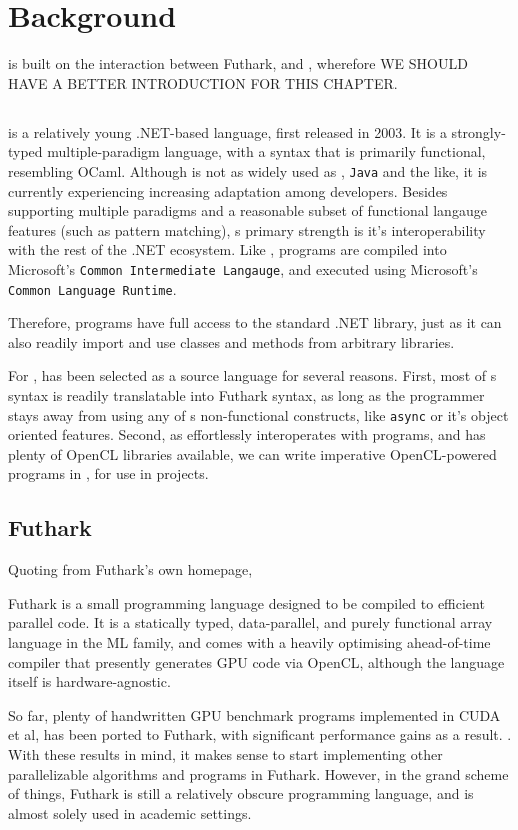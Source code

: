 \chapter{Background}
\fshark{} is built on the interaction between Futhark, \fsharp{} and \csharp{},
wherefore WE SHOULD HAVE A BETTER INTRODUCTION FOR THIS CHAPTER.

\section*{\fsharp{}}
\fsharp{} is a relatively young .NET-based language, first released in 2003.
It is a strongly-typed multiple-paradigm language, with a syntax that is
primarily functional, resembling OCaml.
Although \fsharp{} is not as widely used as \csharp{}, \texttt{Java} and the
like, it is currently experiencing increasing adaptation among
developers\cite{citeme}.
Besides supporting multiple paradigms and a reasonable subset of functional
langauge features (such as pattern matching), \fsharp{}s primary strength is
it's interoperability with the rest of the .NET ecosystem. Like \csharp{},
\fsharp{} programs are compiled into Microsoft's \texttt{Common Intermediate
  Langauge}, and executed using Microsoft's \texttt{Common Language Runtime}.

Therefore, \fsharp{} programs have full access to the standard .NET library,
just as it can also readily import and use classes and methods from arbitrary
\csharp{} libraries.

For \fshark{}, \fsharp{} has been selected as a source language for several
reasons.
First, most of \fsharp{}s syntax is readily translatable into Futhark syntax, as
long as the programmer stays away from using any of \fsharp{}s non-functional
constructs, like \texttt{async} or it's object oriented features.
Second, as \fsharp{} effortlessly interoperates with \csharp{} programs, and
\csharp{} has plenty of OpenCL libraries available, we can write imperative
OpenCL-powered programs in \csharp{}, for use in \fsharp{} projects.


\section*{Futhark}
Quoting from Futhark's own homepage,
\begin{formal}
  Futhark is a small programming language designed to be compiled to efficient parallel code. It is a statically typed, data-parallel, and purely functional array language in the ML family, and comes with a heavily optimising ahead-of-time compiler that presently generates GPU code via OpenCL, although the language itself is hardware-agnostic.
\end{formal}
So far, plenty of handwritten GPU benchmark programs implemented in CUDA et al,
has been ported to Futhark, with significant performance gains as a result.
\cite{citesomething}. With these results in mind, it makes sense to start
implementing other parallelizable algorithms and programs in Futhark. However,
in the grand scheme of things, Futhark is still a relatively obscure programming
language, and is almost solely used in academic settings.

